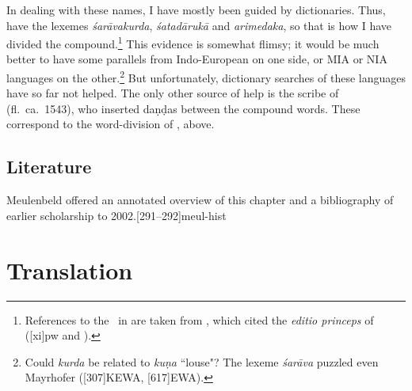     In dealing with these names, I have mostly been guided by
dictionaries. Thus, \citet{moni-sans} have the lexemes
\emph{śarāvakurda}, \emph{śatadārukā} and \emph{arimedaka}, so
that is how I have divided the compound.\footnote{References to the \SS\ in 
\citet{moni-sans} are taken from \cite{pw}, which cited the \emph{editio 
princeps} of 
\citet{gupt-1835} ([xi]{pw} and \cite[149--150]{gild-1847}).}  
This evidence is
somewhat flimsy; it would be much better to have some parallels
from Indo-European on one side, or MIA or NIA languages on the
other.\footnote{Could \emph{kurda} be related to \emph{kuṇa}
    “louse"? The lexeme \emph{śarāva} puzzled even Mayrhofer 
    ([307]{KEWA}, 
    [617]{EWA}).}  But unfortunately, dictionary searches of these
    languages have so far not helped.  The only other source of help is
    the scribe of  (fl.\ ca.\ 1543), who
    inserted daṇḍas between the compound words.  These correspond to
    the word-division of \citet{moni-sans}, above.
        
\newpage
\subsection{Literature}

Meulenbeld offered an annotated overview of this chapter and a
bibliography of earlier scholarship to
2002.[291--292]{meul-hist}

\section{Translation}

